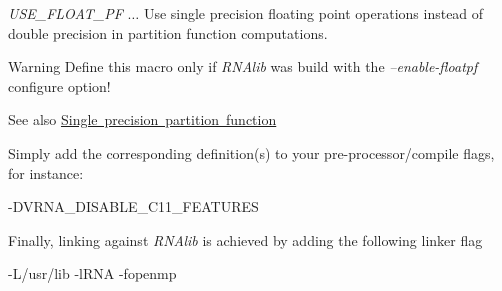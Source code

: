 \begin{DoxyItemize}
\item {\itshape U\+S\+E\+\_\+\+F\+L\+O\+A\+T\+\_\+\+PF} $\ldots$ Use single precision floating point operations instead of double precision in partition function computations. \begin{DoxyWarning}{Warning}
Define this macro only if {\itshape R\+N\+Alib} was build with the {\itshape --enable-\/floatpf} configure option! 
\end{DoxyWarning}
\begin{DoxySeeAlso}{See also}
\mbox{\hyperlink{install_config_float_pf}{Single precision partition function}}
\end{DoxySeeAlso}

\end{DoxyItemize}Simply add the corresponding definition(s) to your pre-\/processor/compile flags, for instance\+:

\begin{DoxyVerb}-DVRNA_DISABLE_C11_FEATURES
\end{DoxyVerb}


Finally, linking against {\itshape R\+N\+Alib} is achieved by adding the following linker flag

\begin{DoxyVerb}-L/usr/lib -lRNA -fopenmp
\end{DoxyVerb}


